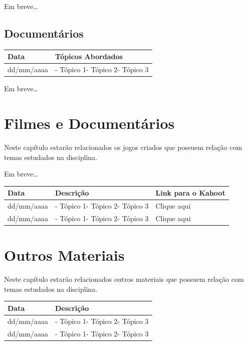 \documentclass[
]{book}
\begin{document}
Em breve\ldots{}

\hypertarget{documentuxe1rios}{%
\section{Documentários}\label{documentuxe1rios}}

\begin{longtable}[]{@{}ll@{}}
\toprule()
Data & Tópicos Abordados \\
\midrule()
\endhead
dd/mm/aaaa & - Tópico 1- Tópico 2- Tópico 3 \\
\bottomrule()
\end{longtable}

Em breve\ldots{}

\hypertarget{filmes-e-documentuxe1rios-1}{%
\chapter{Filmes e Documentários}\label{filmes-e-documentuxe1rios-1}}

Neste capítulo estarão relacionados os jogos criados que possuem relação com temas estudados na disciplina.

Em breve\ldots{}

\begin{longtable}[]{@{}lll@{}}
\toprule()
Data & Descrição & Link para o Kahoot \\
\midrule()
\endhead
dd/mm/aaaa & - Tópico 1- Tópico 2- Tópico 3 & Clique aqui \\
dd/mm/aaaa & - Tópico 1- Tópico 2- Tópico 3 & Clique aqui \\
\bottomrule()
\end{longtable}

\hypertarget{outros-materiais}{%
\chapter{Outros Materiais}\label{outros-materiais}}

Neste capítulo estarão relacionados outros materiais que possuem relação com temas estudados na disciplina.

\begin{longtable}[]{@{}ll@{}}
\toprule()
Data & Descrição \\
\midrule()
\endhead
dd/mm/aaaa & - Tópico 1- Tópico 2- Tópico 3 \\
dd/mm/aaaa & - Tópico 1- Tópico 2- Tópico 3 \\
\bottomrule()
\end{longtable}
\end{document}
